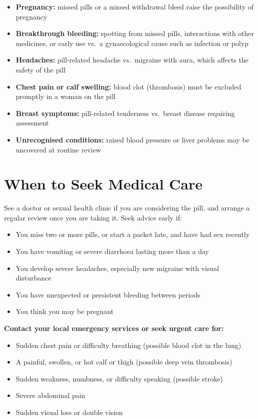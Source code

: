 \begin{itemize}
    \item \textbf{Pregnancy:} missed pills or a missed withdrawal bleed raise the possibility of pregnancy
    \item \textbf{Breakthrough bleeding:} spotting from missed pills, interactions with other medicines, or early use vs.\ a gynaecological cause such as infection or polyp
    \item \textbf{Headaches:} pill-related headache vs.\ migraine with aura, which affects the safety of the pill
    \item \textbf{Chest pain or calf swelling:} blood clot (thrombosis) must be excluded promptly in a woman on the pill
    \item \textbf{Breast symptoms:} pill-related tenderness vs.\ breast disease requiring assessment
    \item \textbf{Unrecognised conditions:} raised blood pressure or liver problems may be uncovered at routine review
\end{itemize}

\section*{When to Seek Medical Care}
See a doctor or sexual health clinic if you are considering the pill, and arrange a regular review once you are taking it. Seek advice early if:

\begin{itemize}
    \item You miss two or more pills, or start a packet late, and have had sex recently
    \item You have vomiting or severe diarrhoea lasting more than a day
    \item You develop severe headaches, especially new migraine with visual disturbance
    \item You have unexpected or persistent bleeding between periods
    \item You think you may be pregnant
\end{itemize}

\textbf{Contact your local emergency services or seek urgent care for:}
\begin{itemize}
    \item Sudden chest pain or difficulty breathing (possible blood clot in the lung)
    \item A painful, swollen, or hot calf or thigh (possible deep vein thrombosis)
    \item Sudden weakness, numbness, or difficulty speaking (possible stroke)
    \item Severe abdominal pain
    \item Sudden visual loss or double vision
\end{itemize}


